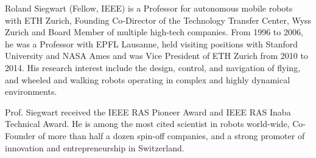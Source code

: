 \documentclass[journal]{IEEEtran}  %
\begin{document}
\vspace{-1cm}
\begin{IEEEbiography}{Roland Siegwart}
(Fellow, IEEE) is a Professor for autonomous mobile robots with ETH Zurich, Founding Co-Director of the Technology Transfer Center, Wyss Zurich and Board Member of multiple high-tech companies. From 1996 to 2006, he was a Professor with EPFL Lausanne, held visiting positions with Stanford University and NASA Ames and was Vice President of ETH Zurich from 2010 to 2014. His research interest include the design, control, and navigation of flying, and wheeled and walking robots operating in complex and highly dynamical environments.

Prof. Siegwart received the IEEE RAS Pioneer Award and IEEE RAS Inaba Technical Award. He is among the most cited scientist in robots world-wide, Co-Founder of more than half a dozen spin-off companies, and a strong promoter of innovation and entrepreneurship in Switzerland.
\end{IEEEbiography}
\vfill
\end{document}
